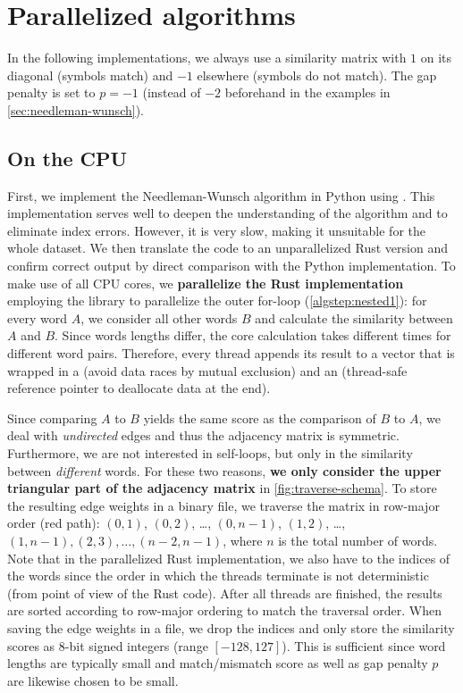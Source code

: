 \section{Parallelized algorithms}
\label{sec:impl}

In the following implementations, we always use a similarity matrix with $1$ on its diagonal (symbols match) and $-1$ elsewhere (symbols do not match). The gap penalty is set to $p=-1$ (instead of $-2$ beforehand in the examples in \autoref{sec:needleman-wunsch}).

\subsection{On the CPU}

First, we implement the Needleman-Wunsch algorithm in Python using . This implementation serves well to deepen the understanding of the algorithm and to eliminate index errors. However, it is very slow, making it unsuitable for the whole dataset. We then translate the code to an unparallelized Rust version and confirm correct output by direct comparison with the Python implementation. To make use of all CPU cores, we \textbf{parallelize the Rust implementation} employing the  library to parallelize the outer for-loop (\autoref{algstep:nested1}): for every word $A$, we consider all other words $B$ and calculate the similarity between $A$ and $B$. Since words lengths differ, the core calculation takes different times for different word pairs. Therefore, every thread appends its result to a vector that is wrapped in a  (avoid data races by mutual exclusion) and an  (thread-safe reference pointer to deallocate data at the end).

Since comparing $A$ to $B$ yields the same score as the comparison of $B$ to $A$, we deal with \textit{undirected} edges and thus the adjacency matrix is symmetric. Furthermore, we are not interested in self-loops, but only in the similarity between \textit{different} words. For these two reasons, \textbf{we only consider the upper triangular part of the adjacency matrix} in \autoref{fig:traverse-schema}. To store the resulting edge weights in a binary file, we traverse the matrix in row-major order (red path): $(0,1)$, $(0,2)$, \ldots, $(0,n-1)$, $(1,2)$, \ldots, $(1,n-1), (2,3), \ldots, (n-2,n-1)$, where $n$ is the total number of words. Note that in the parallelized Rust implementation, we also have to the indices of the words since the order in which the threads terminate is not deterministic (from point of view of the Rust code). After all threads are finished, the results are sorted according to row-major ordering to match the traversal order. When saving the edge weights in a file, we drop the indices and only store the similarity scores as 8-bit signed integers (range $[-128,127]$). This is sufficient since word lengths are typically small and match/mismatch score as well as gap penalty $p$ are likewise chosen to be small.


